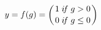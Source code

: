 \documentclass[10pt]{article}
\begin{document}
\begin{align*}y = f(g) = \bigg( {1 \; i\!f \; g > 0 \atop 0 \; i\!f \; g \leq 0} \bigg)\end{align*}
\end{document}
